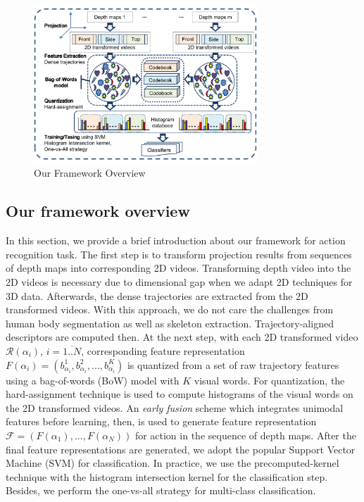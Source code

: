 \documentclass[final,3p,times,twocolumn]{elsarticle}
\begin{document}
\begin{figure}[ht]
	\centering
		\includegraphics[width=0.75\textwidth]{Figures/Framework3D.pdf} %
	\caption{Our Framework Overview}
	\label{Figure_FrameworkOverview}
\end{figure}

\subsection{Our framework overview}

In this section, we provide a brief introduction about our framework for action recognition task.
The first step is to transform projection results from sequences of depth maps into corresponding 2D videos.
Transforming depth video into the 2D videos is necessary due to dimensional gap when we adapt 2D techniques for 3D data.
Afterwards, the dense trajectories \cite{wang2011densetraj} are extracted from the 2D transformed videos.
With this approach, we do not care the challenges from human body segmentation as well as skeleton extraction.
Trajectory-aligned descriptors are computed then. At the next step, with each 2D transformed video $\mathcal{R}(\alpha_i)$, $i = \overline{1..N}$, corresponding feature representation $F(\alpha_i) = (b^1_\text{$\alpha_i$},b^2_\text{$\alpha_i$},...,b^K_\text{$\alpha_i$})$ is quantized from a set of raw trajectory features using a bag-of-words (BoW) model with $K$ visual words.
For quantization, the hard-assignment technique is used to compute histograms of the visual words on the 2D transformed videos.
An \textit{early fusion} scheme which integrates unimodal features before learning, then, is used to generate feature representation $\mathcal{F} = (F(\alpha_1),...,F(\alpha_N))$ for action in the sequence of depth maps.
After the final feature representations are generated, we adopt the popular Support Vector Machine (SVM) for classification. In practice, we use the precomputed-kernel technique with the histogram intersection kernel for the classification step.
Besides, we perform the one-vs-all strategy for multi-class classification.
\end{document}

